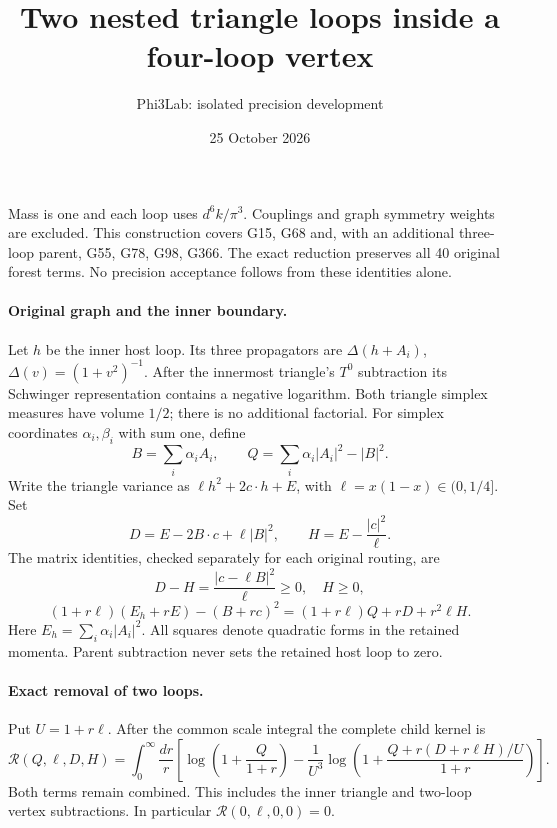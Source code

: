 \documentclass[11pt]{article}
\title{Two nested triangle loops inside a four-loop vertex}
\author{Phi3Lab: isolated precision development}
\date{25 October 2026}
\begin{document}
\maketitle
Mass is one and each loop uses $d^6k/\pi^3$. Couplings and graph symmetry weights are excluded. This construction covers G15, G68 and, with an additional three-loop parent, G55, G78, G98, G366. The exact reduction preserves all 40 original forest terms. No precision acceptance follows from these identities alone.

\paragraph{Original graph and the inner boundary.}
Let $h$ be the inner host loop. Its three propagators are
$\Delta(h+A_i)$, $\Delta(v)=(1+v^2)^{-1}$.
After the innermost triangle's $T^0$ subtraction its Schwinger representation contains a negative logarithm. Both triangle simplex measures have volume $1/2$; there is no additional factorial. For simplex coordinates $\alpha_i,\beta_i$ with sum one, define
\[
 B=\sum_i\alpha_i A_i,\qquad
 Q=\sum_i\alpha_i |A_i|^2-|B|^2.
\]
Write the triangle variance as $\ell h^2+2c\cdot h+E$, with
$\ell=x(1-x)\in(0,1/4]$. Set
\[
 D=E-2B\cdot c+\ell|B|^2,\qquad H=E-\frac{|c|^2}{\ell}.
\]
The matrix identities, checked separately for each original routing, are
\[
 D-H=\frac{|c-\ell B|^2}{\ell}\ge0,\quad H\ge0,
\]
\[
 (1+r\ell)(E_h+rE)-(B+rc)^2
 =(1+r\ell)Q+rD+r^2\ell H.
\]
Here $E_h=\sum_i\alpha_i|A_i|^2$. All squares denote quadratic forms in the retained momenta. Parent subtraction never sets the retained host loop to zero.

\paragraph{Exact removal of two loops.}
Put $U=1+r\ell$. After the common scale integral the complete child kernel is
\begin{equation}
 \mathcal R(Q,\ell,D,H)=
 \int_0^\infty\frac{dr}{r}
 \left[
 \log\left(1+\frac{Q}{1+r}\right)
 -\frac{1}{U^3}\log\left(1+
 \frac{Q+r(D+r\ell H)/U}{1+r}\right)
 \right].
 \label{eq:radial}
\end{equation}
Both terms remain combined. This includes the inner triangle and two-loop vertex subtractions. In particular $\mathcal R(0,\ell,0,0)=0$.
\end{document}
